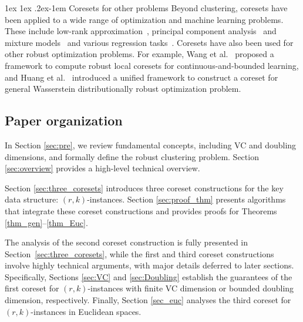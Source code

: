 \documentclass[11pt,letterpaper]{article}
\makeatletter
\renewcommand{\paragraph}{%
  \@startsection{paragraph}{4}%
  {\z@}{1ex \@plus 1ex \@minus .2ex}{-1em}%
  {\normalfont\normalsize\bfseries}%
}
\theoremstyle{definition}
\newcommand{\LH}[1]{\textcolor{blue}{LH: #1}}
\makeatother
\begin{document}



\paragraph{Coresets for other problems}
Beyond clustering, coresets have been applied to a wide range of optimization and machine learning problems.
These include low-rank approximation~\cite{cohen2017input}, principal component analysis~\cite{feldman2020turning} and mixture models~\cite{huang2020coresets,lucic2018training}
and various regression tasks~\cite{chhaya2020coresets,MMWY22,WY23:sensitivity,MO24:sensitivity,AP24,gajjar:COLT,LT25}. Coresets have also been used for other robust optimization problems. For example, Wang et al.~\cite{wang2021robust} proposed a framework to compute robust local coresets for continuous-and-bounded learning, and Huang et al.~\cite{huang2022coresets} introduced a unified framework to construct a coreset for general Wasserstein distributionally robust optimization problem. 





\subsection{Paper organization}
In Section \ref{sec:pre}, we review fundamental concepts, including VC and doubling dimensions, and formally define the robust clustering problem. Section \ref{sec:overview} provides a high-level technical overview.

Section \ref{sec:three_coresets} introduces three coreset constructions for the key data structure: \( (r,k) \)-instances.  %
Section \ref{sec:proof_thm} presents algorithms that integrate these coreset constructions and provides proofs for Theorems \ref{thm_gen}--\ref{thm_Euc}.  
%

The analysis of the second coreset construction is fully presented in Section~\ref{sec:three_coresets}, while the first and third coreset constructions involve highly technical arguments, with major details deferred to later sections. Specifically, Sections \ref{sec:VC} and \ref{sec:Doubling} establish the guarantees of the first coreset for $(r,k)$-instances with finite VC dimension or bounded doubling dimension, respectively. Finally, 
Section \ref{sec_euc} analyses the third coreset for $(r,k)$-instances in Euclidean spaces.%
\end{document}
